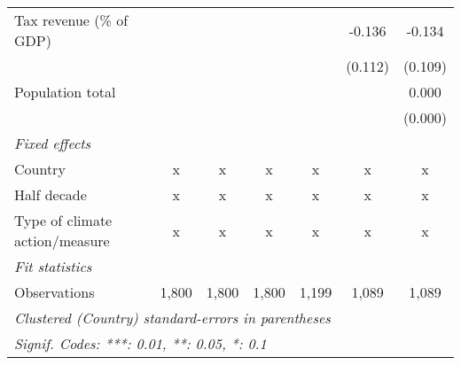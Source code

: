 \begin{tabular}{lcccccc}
   Tax revenue (\% of GDP)                &         &              &               &               & -0.136        & -0.134\\   
                                          &         &              &               &               & (0.112)       & (0.109)\\   
   Population total                       &         &              &               &               &               & 0.000\\   
                                          &         &              &               &               &               & (0.000)\\   
   \emph{Fixed effects}\\
   Country                                & x       & x            & x             & x             & x             & x\\  
   Half decade                            & x       & x            & x             & x             & x             & x\\  
   Type of climate action/measure         & x       & x            & x             & x             & x             & x\\  
   \midrule \emph{Fit statistics}\\
   Observations                           & 1,800   & 1,800        & 1,800         & 1,199         & 1,089         & 1,089\\  
   \midrule
   \multicolumn{7}{l}{\emph{Clustered (Country) standard-errors in parentheses}}\\
   \multicolumn{7}{l}{\emph{Signif. Codes: ***: 0.01, **: 0.05, *: 0.1}}\\
\end{tabular}
\par\endgroup


